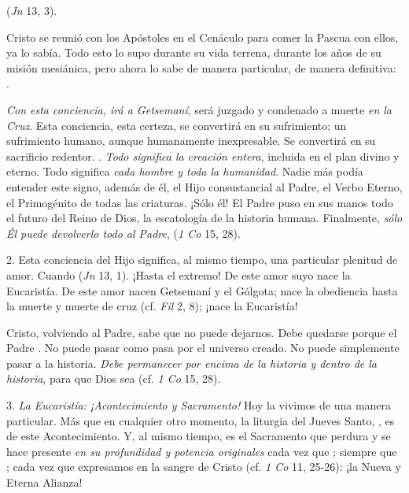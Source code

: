\begin{body}
 (\textit{Jn} 13, 3).

 Cristo se reunió con los Apóstoles en el Cenáculo para comer la Pascua con ellos, ya lo sabía. Todo esto lo supo durante su vida terrena, durante los años de su misión mesiánica, pero ahora lo sabe de manera particular, de manera definitiva: . 

\textit{Con esta conciencia, irá a Getsemaní}, será juzgado y condenado a muerte \textit{en la Cruz}. Esta conciencia, esta certeza, se convertirá en su sufrimiento; un sufrimiento humano, aunque humanamente inexpresable. Se convertirá en su sacrificio redentor. . \textit{Todo significa la creación entera}, incluida en el plan divino y eterno. Todo significa \textit{cada hombre y toda la humanidad}. Nadie más podía entender este signo, además de él, el Hijo consustancial al Padre, el Verbo Eterno, el Primogénito de todas las criaturas. ¡Sólo él! El Padre puso en sus manos todo el futuro del Reino de Dios, la escatología de la historia humana. Finalmente, \textit{sólo Él puede devolverlo todo al Padre},  (\textit{1 Co} 15, 28). 

2. Esta conciencia del Hijo significa, al mismo tiempo, una particular plenitud de amor. Cuando  (\textit{Jn} 13, 1). ¡Hasta el extremo! De este amor suyo  nace la Eucaristía. De este amor nacen Getsemaní y el Gólgota; nace la obediencia hasta la muerte y muerte de cruz (cf. \textit{Fil} 2, 8); ¡nace la Eucaristía! 

Cristo, volviendo al Padre, sabe que no puede dejarnos. Debe quedarse porque el Padre . No puede pasar como  pasa por el universo creado. No puede simplemente pasar a la historia. \textit{Debe permanecer por encima de la historia y dentro de la historia}, para que Dios sea  (cf. \textit{1 Co} 15, 28). 

3. \textit{La Eucaristía: ¡Acontecimiento y Sacramento!} Hoy la vivimos de una manera particular. Más que en cualquier otro momento, la liturgia del Jueves Santo, , es  de este Acontecimiento. Y, al mismo tiempo, es el Sacramento que perdura y se hace presente \textit{en su profundidad y potencia originales} cada vez que ; siempre que ; cada vez que expresamos  en la sangre de Cristo (cf. \textit{1 Co} 11, 25-26): ¡la Nueva y Eterna Alianza! 


\end{body}
